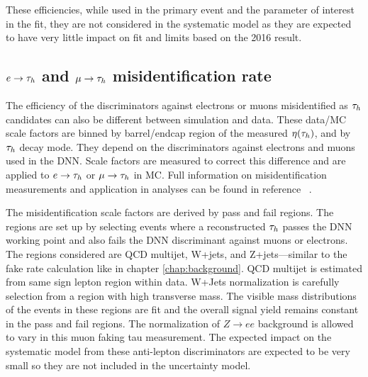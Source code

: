 These efficiencies, while used in the primary event and the parameter of interest in the fit, they are not considered in the systematic model as they are expected to have very little impact on fit and limits based on the 2016 result. 


\subsection{$e \rightarrow \tau_h$  and $\mu \rightarrow \tau_h$ misidentification rate}
The efficiency of the discriminators against electrons or muons misidentified as $\tau_h$ candidates can also be different between simulation and data. 
These data/MC scale factors are
binned by barrel/endcap region of the measured $\eta(\tau_h)$, and by $\tau_h$ decay mode. They depend on the discriminators against electrons and muons used in the DNN. 
Scale factors are measured to correct this difference and are applied to $e \rightarrow \tau_h$ or $\mu \rightarrow \tau_h$ in MC. Full information on misidentification measurements and application in analyses can be found in reference ~\cite{TAUIDTwiki}. 


The misidentification scale factors are derived by pass and fail regions. The regions are set up by selecting events where a reconstructed $\tau_h$ passes the DNN working point and also fails the DNN discriminant against muons or electrons. The regions considered are QCD multijet, W+jets, and Z+jets---similar to the fake rate calculation like in chapter \ref{chap:background}. QCD multijet is estimated from same sign lepton region within data. W+Jets normalization is carefully selection from a region with high transverse mass. The visible mass distributions of the events in these regions are fit and the overall signal yield remains constant in the pass and fail regions. The normalization of $Z \to e e $ background is allowed to vary in this muon faking tau measurement.   
The expected impact on the systematic model from these anti-lepton discriminators are expected to be very small so they are not included in the uncertainty model.



